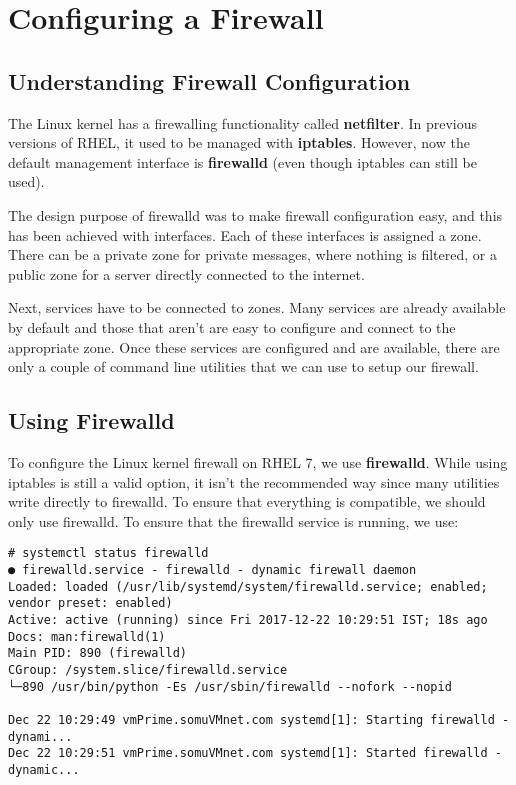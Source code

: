 \chapter{Configuring a Firewall}

\section{Understanding Firewall Configuration}
The Linux kernel has a firewalling functionality called \textbf{netfilter}. In previous versions of RHEL, it used to be managed with \textbf{iptables}. However, now the default management interface is \textbf{firewalld} (even though iptables can still be used). 

The design purpose of firewalld was to make firewall configuration easy, and this has been achieved with interfaces. Each of these interfaces is assigned a zone. There can be a private zone for private messages, where nothing is filtered, or a public zone for a server directly connected to the internet. 

Next, services have to be connected to zones. Many services are already available by default and those that aren't are easy to configure and connect to the appropriate zone. Once these services are configured and are available, there are only a couple of command line utilities that we can use to setup our firewall. 

\section{Using Firewalld}
To configure the Linux kernel firewall on RHEL 7, we use \textbf{firewalld}. While using iptables is still a valid option, it isn't the recommended way since many utilities write directly to firewalld. To ensure that everything is compatible, we should only use firewalld. To ensure that the firewalld service is running, we use:

\vspace{-15pt}
\begin{verbatim}
# systemctl status firewalld
● firewalld.service - firewalld - dynamic firewall daemon
Loaded: loaded (/usr/lib/systemd/system/firewalld.service; enabled; vendor preset: enabled)
Active: active (running) since Fri 2017-12-22 10:29:51 IST; 18s ago
Docs: man:firewalld(1)
Main PID: 890 (firewalld)
CGroup: /system.slice/firewalld.service
└─890 /usr/bin/python -Es /usr/sbin/firewalld --nofork --nopid

Dec 22 10:29:49 vmPrime.somuVMnet.com systemd[1]: Starting firewalld - dynami...
Dec 22 10:29:51 vmPrime.somuVMnet.com systemd[1]: Started firewalld - dynamic...
\end{verbatim}
\vspace{-10pt}

